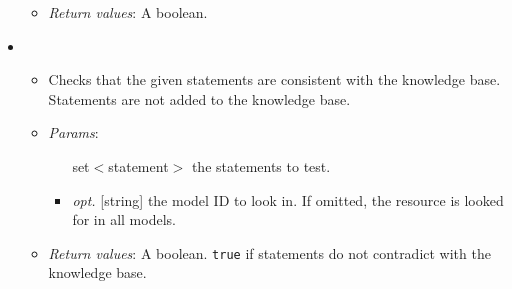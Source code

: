 \begin{itemize}
\begin{itemize}
\item  \emph{Return values}: A boolean.
\end{itemize}

\item  {}
\begin{itemize}
\item  Checks that the given statements are consistent with the knowledge base. Statements are not added to the knowledge base.
\item  \emph{Params}:
\begin{itemize}
\item  [set$<$statement$>$] the statements to test.
\item  \emph{opt.} [string] the model ID to look in. If omitted, the resource is looked for in all models. 
\end{itemize}

\item  \emph{Return values}: A boolean. \texttt{true} if statements do not contradict with the knowledge base.
\end{itemize}


\end{itemize}
